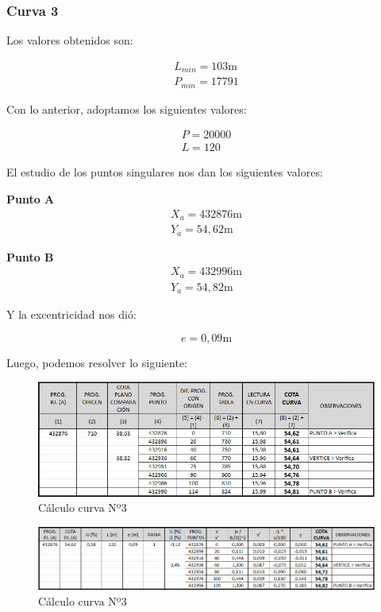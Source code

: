 \documentclass[../main.tex]{subfiles}
\begin{document}
\subsubsection{Curva 3}
Los valores obtenidos son:

\begin{align*}
    L_{min} = 103 \text{m} \\
    P_{min} = 17791
\end{align*}

Con lo anterior, adoptamos los siguientes valores:

\begin{align*}
    P = 20000 \\
    L = 120
\end{align*}

El estudio de los puntos singulares nos dan los siguientes valores:

\textbf{Punto A}
\begin{align*}
    X_a = 432876 \text{m} \\
    Y_a = 54,62 \text{m}
\end{align*}

\textbf{Punto B}
\begin{align*}
    X_a = 432996 \text{m} \\
    Y_a = 54,82 \text{m}
\end{align*}

Y la excentricidad nos dió:

\begin{equation*}
    e = 0,09 \text{m}
\end{equation*}

Luego, podemos resolver lo siguiente:

\begin{figure}[h]
    \centering
    \includegraphics[width=\textwidth]{images/google_sheets/Screenshot_14.png}
    \caption{Cálculo curva Nº3}
    \label{fig:curva3-1}
\end{figure}

\begin{figure}[h]
    \centering
    \includegraphics[width=\textwidth]{images/google_sheets/Screenshot_15.png}
    \caption{Cálculo curva Nº3}
    \label{fig:curva3-2}
\end{figure}
\end{document}
